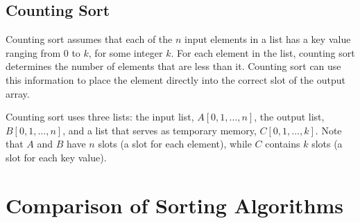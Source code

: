 \documentclass[twoside,12pt,a4paper,english]{book}
\theoremstyle{definition}
\theoremstyle{problemstyle}
\theoremstyle{problemstyle}
\theoremstyle{problemstyle}
\begin{document}
\subsection{Counting Sort}

Counting sort assumes that each of the $n$ input elements in a list has a key value ranging from $0$ to $k$, for some integer $k$. For each element in the list, counting sort determines the number of elements that are less than it. Counting sort can use this information to place the element directly into the correct slot of the output array.

Counting sort uses three lists: the input list, \texttt{$A[0,1,...,n]$}, the output list, \texttt{$B[0,1,...,n]$}, and a list that serves as temporary memory, \texttt{$C[0,1,...,k]$}. Note that $A$ and $B$ have $n$ slots (a slot for each element), while $C$ contains $k$ slots (a slot for each key value).

\section{Comparison of Sorting Algorithms}
\end{document}
